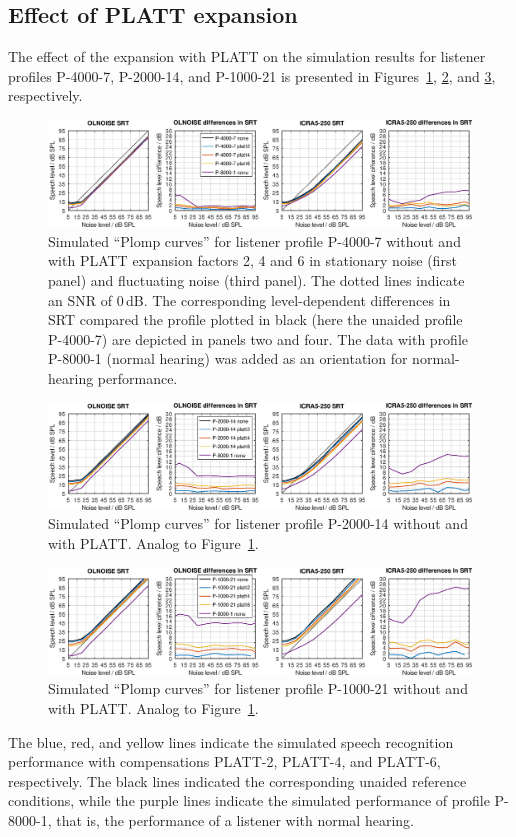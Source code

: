 \documentclass[10pt,a4paper,twocolumn]{article}
\begin{document}
\subsection*{Effect of PLATT expansion}
%
The effect of the expansion with PLATT on the simulation results for listener profiles P-4000-7, P-2000-14, and P-1000-21 is presented in Figures~\ref{fig:15}, \ref{fig:16}, and \ref{fig:17}, respectively.
%
\begin{figure}[h!]
  \centerline{\includegraphics[width=\textwidth]{images/SRTs-platt-P-4000-7}}
	\caption{Simulated \enquote{Plomp curves} for listener profile P-4000-7 without and with PLATT expansion factors 2, 4 and 6 in stationary noise (first panel) and fluctuating noise (third panel).
	The dotted lines indicate an SNR of 0\,dB.
	The corresponding level-dependent differences in SRT compared the profile plotted in black (here the unaided profile P-4000-7) are depicted in panels two and four.
	The data with profile P-8000-1 (normal hearing) was added as an orientation for normal-hearing performance.}
  \label{fig:15}
\end{figure}
%
\begin{figure}[h!]
  \centerline{\includegraphics[width=\textwidth]{images/SRTs-platt-P-2000-14}}
  \caption{Simulated \enquote{Plomp curves} for listener profile P-2000-14 without and with PLATT. Analog to Figure~\ref{fig:15}.}
  \label{fig:16}
\end{figure}
%
\begin{figure}[h!]
  \centerline{\includegraphics[width=\textwidth]{images/SRTs-platt-P-1000-21}}
  \caption{Simulated \enquote{Plomp curves} for listener profile P-1000-21 without and with PLATT. Analog to Figure~\ref{fig:15}.}
  \label{fig:17}
\end{figure}
%
The blue, red, and yellow lines indicate the simulated speech recognition performance with compensations PLATT-2, PLATT-4, and PLATT-6, respectively.
%
The black lines indicated the corresponding unaided reference conditions, while the purple lines indicate the simulated performance of profile P-8000-1, that is, the performance of a listener with normal hearing.
\end{document}
